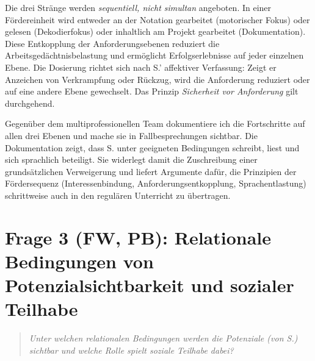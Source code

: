 \documentclass[ngerman, a4paper]{article}
\begin{document}
Die drei Stränge werden \textit{sequentiell, nicht simultan} angeboten. In einer
Fördereinheit wird entweder an der Notation gearbeitet (motorischer Fokus)
oder gelesen (Dekodierfokus) oder inhaltlich am Projekt gearbeitet
(Dokumentation). Diese Entkopplung der Anforderungsebenen reduziert die
Arbeitsgedächtnisbelastung und ermöglicht Erfolgserlebnisse auf jeder
einzelnen Ebene. Die Dosierung richtet sich nach S.' affektiver Verfassung:
Zeigt er Anzeichen von Verkrampfung oder Rückzug, wird die Anforderung
reduziert oder auf eine andere Ebene gewechselt. Das Prinzip
\textit{Sicherheit vor Anforderung} gilt durchgehend.

Gegenüber dem multiprofessionellen Team dokumentiere ich die Fortschritte
auf allen drei Ebenen und mache sie in Fallbesprechungen sichtbar. Die
Dokumentation zeigt, dass S. unter geeigneten Bedingungen schreibt, liest
und sich sprachlich beteiligt. Sie widerlegt damit die Zuschreibung einer
grundsätzlichen Verweigerung und liefert Argumente dafür, die Prinzipien
der Fördersequenz (Interessenbindung, Anforderungsentkopplung,
Sprachentlastung) schrittweise auch in den regulären Unterricht zu übertragen.

\newpage

\section{Frage 3 (FW, PB): Relationale Bedingungen von Potenzialsichtbarkeit
  und sozialer Teilhabe}
\label{sec:frage3}

\begin{quote}\itshape
  Unter welchen relationalen Bedingungen werden
  die Potenziale (von S.) sichtbar und welche Rolle spielt soziale
  Teilhabe dabei?
\end{quote}
\end{document}
